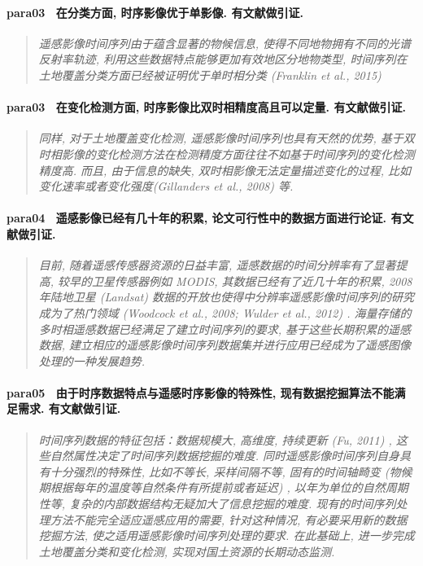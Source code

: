 \paragraph*{para03~
    \textcolor[RGB]{17, 205, 29}{在分类方面, 时序影像优于单影像. 有文献做引证.}}
\begin{quotation}
    \itshape
    遥感影像时间序列由于蕴含显著的物候信息, 使得不同地物拥有不同的光谱反射率轨迹, 利用这些数据特点能够更加有效地区分地物类型, 时间序列在土地覆盖分类方面已经被证明优于单时相分类 (Franklin et al., 2015) 
\end{quotation}

\paragraph*{para03~
    \textcolor[RGB]{17, 205, 29}{在变化检测方面, 时序影像比双时相精度高且可以定量. 有文献做引证.}}
\begin{quotation}
    \itshape
    同样, 对于土地覆盖变化检测, 遥感影像时间序列也具有天然的优势, 基于双时相影像的变化检测方法在检测精度方面往往不如基于时间序列的变化检测精度高. 而且, 由于信息的缺失, 双时相影像无法定量描述变化的过程, 比如变化速率或者变化强度(Gillanders et al., 2008) 等. 
\end{quotation}

\paragraph*{para04~
    \textcolor[RGB]{17, 205, 29}{遥感影像已经有几十年的积累, 论文可行性中的数据方面进行论证. 有文献做引证.}}
\begin{quotation}
    \itshape
    目前, 随着遥感传感器资源的日益丰富, 遥感数据的时间分辨率有了显著提高, 较早的卫星传感器例如 MODIS, 其数据已经有了近几十年的积累, 2008 年陆地卫星 (Landsat) 数据的开放也使得中分辨率遥感影像时间序列的研究成为了热门领域 (Woodcock et al., 2008; Wulder et al., 2012) . 海量存储的多时相遥感数据已经满足了建立时间序列的要求, 基于这些长期积累的遥感数据, 建立相应的遥感影像时间序列数据集并进行应用已经成为了遥感图像处理的一种发展趋势. 
\end{quotation}

\paragraph*{para05~
    \textcolor[RGB]{17, 205, 29}{由于时序数据特点与遥感时序影像的特殊性, 现有数据挖掘算法不能满足需求. 有文献做引证.}}
\begin{quotation}
    \itshape
    时间序列数据的特征包括：数据规模大, 高维度, 持续更新 (Fu, 2011) , 这些自然属性决定了时间序列数据挖掘的难度. 同时遥感影像时间序列自身具有十分强烈的特殊性, 比如不等长, 采样间隔不等, 固有的时间轴畸变 (物候期根据每年的温度等自然条件有所提前或者延迟) , 以年为单位的自然周期性等, 复杂的内部数据结构无疑加大了信息挖掘的难度. 现有的时间序列处理方法不能完全适应遥感应用的需要, 针对这种情况, 有必要采用新的数据挖掘方法, 使之适用遥感影像时间序列处理的要求. 在此基础上, 进一步完成土地覆盖分类和变化检测, 实现对国土资源的长期动态监测.
\end{quotation}

